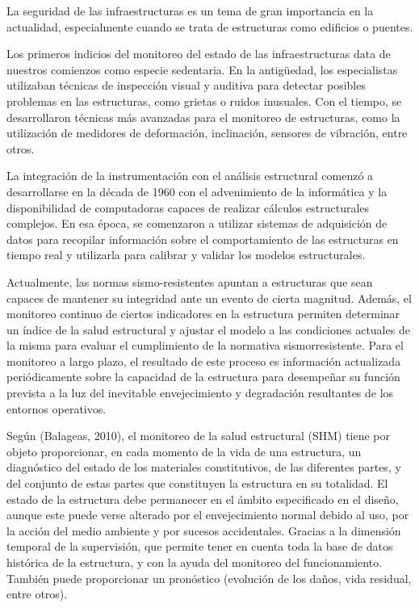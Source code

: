\documentclass[12pt,letterpaper]{article}
\begin{document}
La seguridad de las infraestructuras es un tema de gran importancia en la actualidad, especialmente cuando se trata de estructuras como edificios o puentes.

Los primeros indicios del monitoreo del estado de las infraestructuras data de nuestros comienzos como especie sedentaria.  En la antigüedad, los especialistas utilizaban técnicas de inspección visual y auditiva para detectar posibles problemas en las estructuras, como grietas o ruidos inusuales. Con el tiempo, se desarrollaron técnicas más avanzadas para el monitoreo de estructuras, como la utilización de medidores de deformación, inclinación, sensores de vibración, entre otros.

La integración de la instrumentación con el análisis estructural comenzó a desarrollarse en la década de 1960 con el advenimiento de la informática y la disponibilidad de computadoras capaces de realizar cálculos estructurales complejos. En esa época, se comenzaron a utilizar sistemas de adquisición de datos para recopilar información sobre el comportamiento de las estructuras en tiempo real y utilizarla para calibrar y validar los modelos estructurales.

Actualmente, las normas sismo-resistentes apuntan a estructuras que sean capaces de mantener su integridad ante un evento de cierta magnitud. Además, el monitoreo continuo de ciertos indicadores en la estructura permiten determinar un índice de la salud estructural y ajustar el modelo a las condiciones actuales de la misma para evaluar el cumplimiento de la normativa sismorresistente. Para el monitoreo a largo plazo, el resultado de este proceso es información actualizada periódicamente sobre la capacidad de la estructura para desempeñar su función prevista a la luz del inevitable envejecimiento y degradación resultantes de los entornos operativos.

Según (Balageas, 2010), el monitoreo de la salud estructural (SHM) tiene por objeto proporcionar, en cada momento de la vida de una estructura, un diagnóstico del estado de los materiales constitutivos, de las diferentes
partes, y del conjunto de estas partes que constituyen la estructura en su totalidad. El estado de la estructura debe permanecer en el ámbito especificado en el diseño, aunque este puede verse alterado por el envejecimiento normal debido al uso, por la acción del medio ambiente y por sucesos accidentales. Gracias a la dimensión temporal de la supervisión, que permite tener en cuenta toda la base de datos histórica de la estructura, y con la ayuda del monitoreo del funcionamiento. También puede proporcionar un pronóstico (evolución de los daños, vida residual, entre otros).
\end{document}
